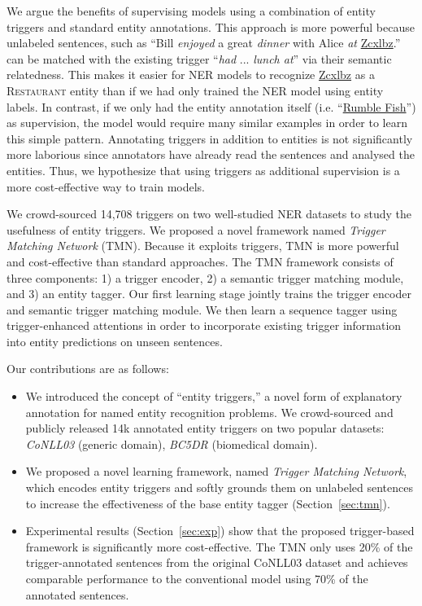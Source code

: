 We argue the benefits of supervising models using a combination of entity triggers and standard entity annotations. This approach is more powerful because unlabeled sentences, such as ``Bill \textit{enjoyed} a great \textit{dinner} with Alice \textit{at} \underline{Zcxlbz}.'' can be matched with the existing trigger ``\textit{had} ... \textit{lunch at}'' via their semantic relatedness. This makes it easier for NER models to recognize \underline{Zcxlbz} as a \textsc{Restaurant} entity than if we had only trained the NER model using entity labels. In contrast, if we only had the entity annotation itself (i.e. ``\underline{Rumble Fish}'') as supervision, the model would require many similar examples in order to learn this simple pattern. Annotating triggers in addition to entities is not significantly more laborious since annotators have already read the sentences and analysed the entities. Thus, we hypothesize that using triggers as additional supervision is a more cost-effective way to train models.

We crowd-sourced 14,708 triggers on two well-studied NER datasets to study the usefulness of entity triggers. We proposed a novel framework named \textit{Trigger Matching Network} ({TMN}). Because it exploits triggers, TMN is more powerful and cost-effective than standard approaches. The TMN framework consists of three components: 1) a trigger encoder, 2) a semantic trigger matching module, and 3) an entity tagger. Our first learning stage jointly trains the trigger encoder and semantic trigger matching module. We then learn a sequence tagger using trigger-enhanced attentions in order to incorporate existing trigger information into entity predictions on unseen sentences.

Our contributions are as follows:
\begin{itemize}
    \item We introduced the concept of ``entity triggers,'' a novel form of explanatory annotation for named entity recognition problems.  We crowd-sourced and publicly released 14k annotated entity triggers on two popular datasets: \textit{CoNLL03} (generic domain), \textit{BC5DR} (biomedical domain).
    \item We proposed a novel learning framework, named \textit{Trigger Matching Network}, which encodes entity triggers and softly grounds them on unlabeled sentences to increase the effectiveness of the base entity tagger (Section~\ref{sec:tmn}). 
    \item Experimental results (Section~\ref{sec:exp}) show that the proposed trigger-based framework is significantly more cost-effective. The TMN only uses 20\% of the trigger-annotated sentences from the original CoNLL03 dataset and achieves comparable performance to the conventional model using 70\% of the annotated sentences. 
\end{itemize}





